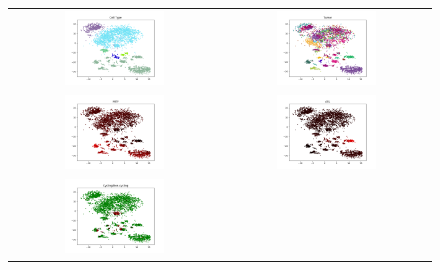 \begin{figure}[!htb]
  \centering
  \begin{tabular}{cc}
    \includegraphics[width=0.5\textwidth]{images/tvptsne_cell.png} &
    \includegraphics[width=0.5\textwidth]{images/tvptsne_tumor.png} \\
    \includegraphics[width=0.5\textwidth]{images/tvptsne_mitf.png} &
    \includegraphics[width=0.5\textwidth]{images/tvptsne_axl.png} \\
    \includegraphics[width=0.5\textwidth]{images/tvptsne_cycling.png} &

\end{tabular}
\end{figure}

